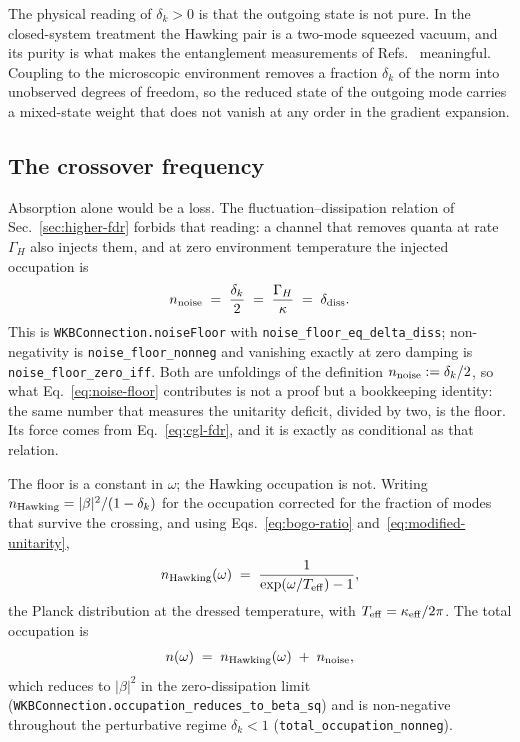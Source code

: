 \documentclass[aps,prd,reprint,nofootinbib,superscriptaddress]{revtex4-2}
\begin{document}
The physical reading of $\delta_k > 0$ is that the outgoing state is not
pure. In the closed-system treatment the Hawking pair is a two-mode
squeezed vacuum, and its purity is what makes the entanglement
measurements of Refs.~\cite{Steinhauer2016,deNova2019} meaningful.
Coupling to the microscopic environment removes a fraction $\delta_k$ of
the norm into unobserved degrees of freedom, so the reduced state of the
outgoing mode carries a mixed-state weight that does not vanish at any
order in the gradient expansion.

\subsection{The crossover frequency}
\label{sec:wkb-crossover}

Absorption alone would be a loss. The fluctuation--dissipation relation
of Sec.~\ref{sec:higher-fdr} forbids that reading: a channel that
removes quanta at rate $\Gamma_H$ also injects them, and at zero
environment temperature the injected occupation is
\begin{equation}
n_{\rm noise} \;=\; \frac{\delta_k}{2} \;=\; \frac{\Gamma_H}{\kappa}
  \;=\; \delta_{\rm diss} .
\label{eq:noise-floor}
\end{equation}
This is \texttt{WKBConnection.noiseFloor} with
\texttt{noise\_floor\_eq\_delta\_diss}; non-negativity is
\texttt{noise\_floor\_nonneg} and vanishing exactly at zero damping is
\texttt{noise\_floor\_zero\_iff}. Both are unfoldings of the definition
$n_{\rm noise} := \delta_k/2$, so what Eq.~\eqref{eq:noise-floor}
contributes is not a proof but a bookkeeping identity: the same number
that measures the unitarity deficit, divided by two, is the floor. Its
force comes from Eq.~\eqref{eq:cgl-fdr}, and it is exactly as
conditional as that relation.

The floor is a constant in $\omega$; the Hawking occupation is not.
Writing $n_{\rm Hawking} = |\beta|^2/(1-\delta_k)$ for the occupation
corrected for the fraction of modes that survive the crossing, and using
Eqs.~\eqref{eq:bogo-ratio} and~\eqref{eq:modified-unitarity},
\begin{equation}
n_{\rm Hawking}(\omega)
  \;=\; \frac{1}{\exp(\omega/T_{\rm eff}) - 1} ,
\label{eq:planck}
\end{equation}
the Planck distribution at the dressed temperature, with
$T_{\rm eff} = \kappa_{\rm eff}/2\pi$. The total occupation is
\begin{equation}
n(\omega) \;=\; n_{\rm Hawking}(\omega) \;+\; n_{\rm noise} ,
\label{eq:total-occupation}
\end{equation}
which reduces to $|\beta|^2$ in the zero-dissipation limit
(\texttt{WKBConnection.occupation\_reduces\_to\_beta\_sq}) and is
non-negative throughout the perturbative regime $\delta_k < 1$
(\texttt{total\_occupation\_nonneg}).
\end{document}
